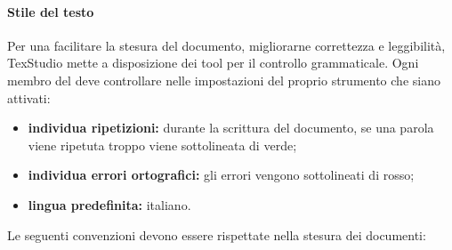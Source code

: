                 \paragraph{Stile del testo}
                Per una facilitare la stesura del documento, migliorarne correttezza e leggibilità, TexStudio mette a disposizione dei tool per il controllo grammaticale. Ogni membro del  deve controllare nelle impostazioni del proprio strumento che siano attivati:
                \begin{itemize}
                	\item \textbf{individua ripetizioni:} durante la scrittura del documento, se una parola viene ripetuta troppo viene sottolineata di verde;
                	\item \textbf{individua errori ortografici:} gli errori vengono sottolineati di rosso;
                	\item \textbf{lingua predefinita:} italiano.
                \end{itemize}
                Le seguenti convenzioni devono essere rispettate nella stesura dei documenti:

